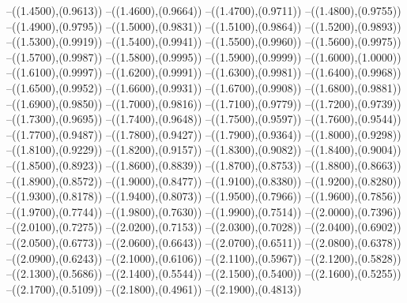 {	--({\sx*(1.4500)},{\sy*(0.9613)})
	--({\sx*(1.4600)},{\sy*(0.9664)})
	--({\sx*(1.4700)},{\sy*(0.9711)})
	--({\sx*(1.4800)},{\sy*(0.9755)})
	--({\sx*(1.4900)},{\sy*(0.9795)})
	--({\sx*(1.5000)},{\sy*(0.9831)})
	--({\sx*(1.5100)},{\sy*(0.9864)})
	--({\sx*(1.5200)},{\sy*(0.9893)})
	--({\sx*(1.5300)},{\sy*(0.9919)})
	--({\sx*(1.5400)},{\sy*(0.9941)})
	--({\sx*(1.5500)},{\sy*(0.9960)})
	--({\sx*(1.5600)},{\sy*(0.9975)})
	--({\sx*(1.5700)},{\sy*(0.9987)})
	--({\sx*(1.5800)},{\sy*(0.9995)})
	--({\sx*(1.5900)},{\sy*(0.9999)})
	--({\sx*(1.6000)},{\sy*(1.0000)})
	--({\sx*(1.6100)},{\sy*(0.9997)})
	--({\sx*(1.6200)},{\sy*(0.9991)})
	--({\sx*(1.6300)},{\sy*(0.9981)})
	--({\sx*(1.6400)},{\sy*(0.9968)})
	--({\sx*(1.6500)},{\sy*(0.9952)})
	--({\sx*(1.6600)},{\sy*(0.9931)})
	--({\sx*(1.6700)},{\sy*(0.9908)})
	--({\sx*(1.6800)},{\sy*(0.9881)})
	--({\sx*(1.6900)},{\sy*(0.9850)})
	--({\sx*(1.7000)},{\sy*(0.9816)})
	--({\sx*(1.7100)},{\sy*(0.9779)})
	--({\sx*(1.7200)},{\sy*(0.9739)})
	--({\sx*(1.7300)},{\sy*(0.9695)})
	--({\sx*(1.7400)},{\sy*(0.9648)})
	--({\sx*(1.7500)},{\sy*(0.9597)})
	--({\sx*(1.7600)},{\sy*(0.9544)})
	--({\sx*(1.7700)},{\sy*(0.9487)})
	--({\sx*(1.7800)},{\sy*(0.9427)})
	--({\sx*(1.7900)},{\sy*(0.9364)})
	--({\sx*(1.8000)},{\sy*(0.9298)})
	--({\sx*(1.8100)},{\sy*(0.9229)})
	--({\sx*(1.8200)},{\sy*(0.9157)})
	--({\sx*(1.8300)},{\sy*(0.9082)})
	--({\sx*(1.8400)},{\sy*(0.9004)})
	--({\sx*(1.8500)},{\sy*(0.8923)})
	--({\sx*(1.8600)},{\sy*(0.8839)})
	--({\sx*(1.8700)},{\sy*(0.8753)})
	--({\sx*(1.8800)},{\sy*(0.8663)})
	--({\sx*(1.8900)},{\sy*(0.8572)})
	--({\sx*(1.9000)},{\sy*(0.8477)})
	--({\sx*(1.9100)},{\sy*(0.8380)})
	--({\sx*(1.9200)},{\sy*(0.8280)})
	--({\sx*(1.9300)},{\sy*(0.8178)})
	--({\sx*(1.9400)},{\sy*(0.8073)})
	--({\sx*(1.9500)},{\sy*(0.7966)})
	--({\sx*(1.9600)},{\sy*(0.7856)})
	--({\sx*(1.9700)},{\sy*(0.7744)})
	--({\sx*(1.9800)},{\sy*(0.7630)})
	--({\sx*(1.9900)},{\sy*(0.7514)})
	--({\sx*(2.0000)},{\sy*(0.7396)})
	--({\sx*(2.0100)},{\sy*(0.7275)})
	--({\sx*(2.0200)},{\sy*(0.7153)})
	--({\sx*(2.0300)},{\sy*(0.7028)})
	--({\sx*(2.0400)},{\sy*(0.6902)})
	--({\sx*(2.0500)},{\sy*(0.6773)})
	--({\sx*(2.0600)},{\sy*(0.6643)})
	--({\sx*(2.0700)},{\sy*(0.6511)})
	--({\sx*(2.0800)},{\sy*(0.6378)})
	--({\sx*(2.0900)},{\sy*(0.6243)})
	--({\sx*(2.1000)},{\sy*(0.6106)})
	--({\sx*(2.1100)},{\sy*(0.5967)})
	--({\sx*(2.1200)},{\sy*(0.5828)})
	--({\sx*(2.1300)},{\sy*(0.5686)})
	--({\sx*(2.1400)},{\sy*(0.5544)})
	--({\sx*(2.1500)},{\sy*(0.5400)})
	--({\sx*(2.1600)},{\sy*(0.5255)})
	--({\sx*(2.1700)},{\sy*(0.5109)})
	--({\sx*(2.1800)},{\sy*(0.4961)})
	--({\sx*(2.1900)},{\sy*(0.4813)})
}

